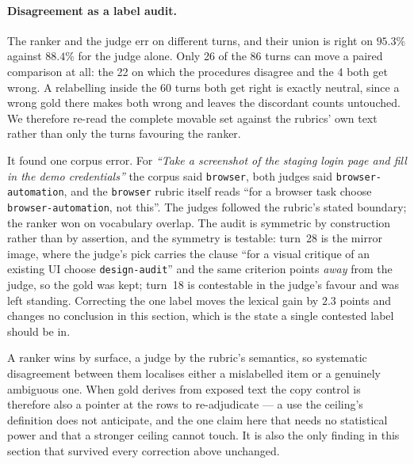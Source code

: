 \documentclass[10pt,twocolumn]{article}
\begin{document}
\paragraph{Disagreement as a label audit.} The ranker and the judge err on different turns, and their union is right on $95.3\%$ against $88.4\%$ for the judge alone. Only 26 of the 86 turns can move a paired comparison at all: the 22 on which the procedures disagree and the 4 both get wrong. A relabelling inside the 60 turns both get right is exactly neutral, since a wrong gold there makes both wrong and leaves the discordant counts untouched. We therefore re-read the complete movable set against the rubrics' own text rather than only the turns favouring the ranker.

It found one corpus error. For \emph{``Take a screenshot of the staging login page and fill in the demo credentials''} the corpus said \texttt{browser}, both judges said \texttt{browser-automation}, and the \texttt{browser} rubric itself reads ``for a browser task choose \texttt{browser-automation}, not this''. The judges followed the rubric's stated boundary; the ranker won on vocabulary overlap. The audit is symmetric by construction rather than by assertion, and the symmetry is testable: turn~28 is the mirror image, where the judge's pick carries the clause ``for a visual critique of an existing UI choose \texttt{design-audit}'' and the same criterion points \emph{away} from the judge, so the gold was kept; turn~18 is contestable in the judge's favour and was left standing. Correcting the one label moves the lexical gain by $2.3$ points and changes no conclusion in this section, which is the state a single contested label should be in.

A ranker wins by surface, a judge by the rubric's semantics, so systematic disagreement between them localises either a mislabelled item or a genuinely ambiguous one. When gold derives from exposed text the copy control is therefore also a pointer at the rows to re-adjudicate --- a use the ceiling's definition does not anticipate, and the one claim here that needs no statistical power and that a stronger ceiling cannot touch. It is also the only finding in this section that survived every correction above unchanged.
\end{document}
